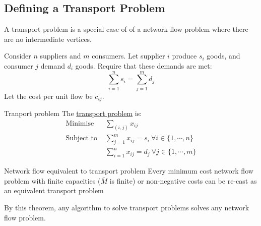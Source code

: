 \documentclass[../Main.tex]{subfiles}
\begin{document}
\subsection{Defining a Transport Problem}
A transport problem is a special case of of a network flow problem where there are no intermediate vertices.

Consider $n$ suppliers and $m$ consumers. Let supplier $i$ produce $s_i$ goods, and consumer $j$ demand $d_i$ goods. Require that these demands are met:
\begin{equation*}
    \sum_{i = 1}^n s_i = \sum_{j = 1}^m d_j
\end{equation*}
Let the cost per unit flow be $c_{ij}$.

\begin{definition}{Tranport problem}
    The \underline{transport problem} is:
    \begin{align*}
        \text{Minimise } &\sum_{(i, j)} x_{ij} \\
        \text{Subject to } &\sum_{j = 1}^m  x_{ij} = s_i~\forall i \in \{1, \cdots, n\} \\
        &\sum_{i = 1}^n x_{ij} = d_j~\forall j \in \{1, \cdots, m\}
    \end{align*}
\end{definition}
\begin{theorem}{Network flow equivalent to transport problem}
    Every minimum cost network flow problem with finite capacities ($\overline{M}$ is finite) or non-negative costs can be re-cast as an equivalent transport problem
    \label{thmFlowTransportEquiv}
\end{theorem}
\begin{remark}
    By this theorem, any algorithm to solve transport problems solves any network flow problem.
\end{remark}
\end{document}
